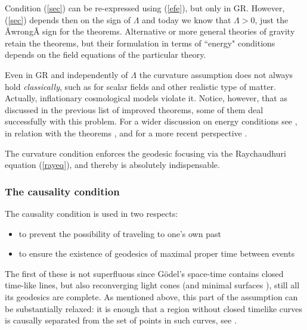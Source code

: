\documentclass[12pt]{iopart}
\begin{document}
Condition (\ref{sec}) can be re-expressed using (\ref{efe}), but only in GR. However, (\ref{sec})  depends then on the sign of $\Lambda$ and today we know that $\Lambda> 0$, just the ÃwrongÃ
sign for the theorems. Alternative or more general theories of gravity retain the theorems, but their formulation in terms of ``energy" conditions depends on the field equations of the particular theory. 

Even in GR and independently of $\Lambda$ the curvature assumption does not always hold \cite{HE,S1} {\em classically}, such as for scalar fields and other realistic type of matter. Actually, inflationary cosmological models violate it. Notice, however, that as discussed in the previous list of improved theorems, some of them deal successfully  with this problem. For a wider discussion on energy conditions see \cite{Vi}, in relation with the theorems \cite{S1}, and for a more recent perspective \cite{Cu}. 

The curvature condition enforces the geodesic focusing via the Raychaudhuri equation (\ref{rayeq}), and thereby is absolutely indispensable. 



\subsubsection{The causality condition}\label{subsec:causalcond}
The causality condition is used in two respects:
\begin{itemize}
\item to prevent the possibility of traveling to one's own past 
\item to ensure the existence of geodesics of maximal proper time between events
\end{itemize}
The first of these is not superfluous
since G\"odel's space-time contains closed 
time-like lines, but also reconverging light cones \cite{Bor2} (and minimal surfaces \cite{Ne1,Bor2,Kri,MS}), still all its geodesics are complete. As mentioned above, this part of the assumption can be substantially relaxed: it is enough that 
a region without closed timelike curves is causally separated from the set of points in such curves, see \cite{MI}.
\end{document}
